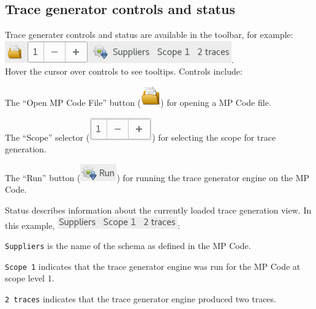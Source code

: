\documentclass[11pt,fleqn]{article} %
\begin{document}
\subsection{Trace generator controls and status}
Trace generater controls and status are available in the toolbar, for example:\\
\includegraphics[scale=.4]{screenshots/toolbar}.\\
Hover the cursor over controls to see tooltips. Controls include:
\begin{compactitem}
\item The ``Open MP Code File'' button (\includegraphics[scale=.4]{screenshots/open_mp_code_file}) for opening a MP Code file.
\item The ``Scope'' selector
(\includegraphics[scale=.4]{screenshots/scope_spinner})
for selecting the scope for trace generation.
\item The ``Run'' button (\includegraphics[scale=.4]{screenshots/run})
for running the trace generator engine on the MP Code.
\end{compactitem}
Status describes information about the currently loaded trace generation view.
In this example,
\includegraphics[scale=.4]{screenshots/example_status}:
\begin{compactitem}
\item \verb+Suppliers+ is the name of the schema as defined in the MP Code.
\item \verb+Scope 1+ indicates that the trace generator engine was run for the MP Code at scope level 1.
\item \verb+2 traces+ indicates that the trace generator engine produced two traces.
\end{compactitem}
\end{document}
